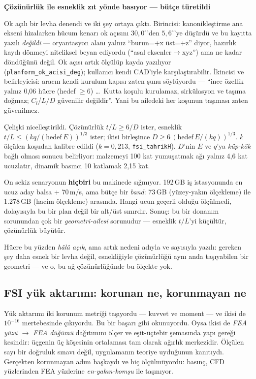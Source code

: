 \documentclass[11pt,a4paper]{article}
\newcommand{\kkkenar}{lacivert}
\newcommand{\kkzemin}{kod}
\newenvironment{renkkutu}[3]{%
  \renewcommand{\kkkenar}{#1}\renewcommand{\kkzemin}{#2}%
  \par\medskip\noindent
  \begin{lrbox}{\kutugovde}%
  \begin{minipage}{\dimexpr\linewidth-2\fboxsep-2\fboxrule\relax}\footnotesize
  \textcolor{#1}{\textbf{#3}}\par\vspace{3pt}%
}{%
  \end{minipage}%
  \end{lrbox}%
  \noindent\fcolorbox{\kkkenar}{\kkzemin}{\usebox{\kutugovde}}%
  \par\medskip
}
\newenvironment{dikkat}[1]{\begin{renkkutu}{orta}{ortabg}{#1}}{\end{renkkutu}}
\begin{document}
\begin{dikkat}{Çözünürlük ile esneklik zıt yönde basıyor --- bütçe türetildi}
Ok açılı bir levha denendi ve iki şey ortaya çıktı. Birincisi:
kanonikleştirme ana ekseni hizalarken hücum kenarı ok açısını $30{,}0^\circ$'den
$5{,}6^\circ$'ye düşürdü ve bu kayıtta yazılı \emph{değildi} --- oryantasyon
alanı yalnız ``burun=+x üst=+z'' diyor, hazırlık kaydı dönmeyi niteliksel
beyan ediyordu (``asal eksenler$\rightarrow$xyz'') ama ne kadar döndüğünü
değil. Ok açısı artık ölçülüp kayda yazılıyor
(\texttt{planform\_ok\_acisi\_deg}); kullanıcı kendi CAD'iyle
karşılaştırabilir. İkincisi ve belirleyicisi: aracın kendi
kurulum kapısı zaten şunu söylüyordu --- ``ince özellik yalnız 0{,}06 hücre
(hedef $\ge$6) \dots\ Kutta koşulu kurulamaz, sirkülasyon ve taşıma doğmaz;
$C_l$/$L/D$ güvenilir değildir''. Yani bu ailedeki her koşunun taşıması
zaten güvenilmez.

Çelişki nicelleştirildi. Çözünürlük $t/L \ge 6/D$ ister, esneklik
$t/L \le (k q / (\text{hedef}\,E))^{1/3}$ ister; ikisi birleşince
$D \ge 6\,(\text{hedef}\,E/(k q))^{1/3}$. $k$ ölçülen koşudan kalibre edildi
($k = 0{,}213$, \texttt{fsi\_tahrikH}). $D$'nin $E$ ve $q$'ya \emph{küp-kök}
bağlı olması sonucu belirliyor: malzemeyi 100 kat yumuşatmak ağı yalnız
4{,}6 kat ucuzlatır, dinamik basıncı 10 katlamak 2{,}15 kat.

On sekiz senaryonun \textbf{hiçbiri} bu makinede sığmıyor. 192\,GB iş
istasyonunda en ucuz aday balsa + 70\,m/s, ama bütçe bir \emph{band}:
73\,GB (yüzey-yakın ölçekleme) ile 1.278\,GB (hacim ölçekleme) arasında.
Hangi ucun geçerli olduğu ölçülmedi, dolayısıyla bu bir plan değil bir
alt/üst sınırdır. Sonuç: bu bir donanım sorunundan çok bir
\emph{geometri-ailesi} sorunudur --- esneklik $t/L$'yi küçültür,
çözünürlük büyütür.
\end{dikkat}

\noindent Hücre bu yüzden \emph{hâlâ açık}, ama artık nedeni adıyla ve
sayısıyla yazılı: gereken şey daha esnek bir levha değil, esnekliğiyle
çözünürlüğü aynı anda taşıyabilen bir geometri --- ve o, bu ağ
çözünürlüğünde bu ölçekte yok.

\subsection{FSI yük aktarımı: korunan ne, korunmayan ne}
\label{sub:fsi-korunum}

Yük aktarımı iki korunum metriği taşıyordu --- kuvvet ve moment --- ve ikisi
de $10^{-16}$ mertebesinde çıkıyordu. Bu bir başarı gibi okunuyordu. Oysa
ikisi de \emph{FEA yüzü $\rightarrow$ FEA düğümü} dağıtımını ölçer ve
eşit-üçtebir şemasında yapı gereği kesindir: üçgenin üç köşesinin ortalaması
tam olarak ağırlık merkezidir. Ölçülen sayı bir doğruluk sınavı değil,
uygulamanın teoriye uyduğunun kanıtıydı. Gerçekten korunmayan adım başkaydı
ve hiç ölçülmüyordu: basınç, CFD yüzlerinden FEA yüzlerine
\emph{en-yakın-komşu} ile taşınıyor.
\end{document}
